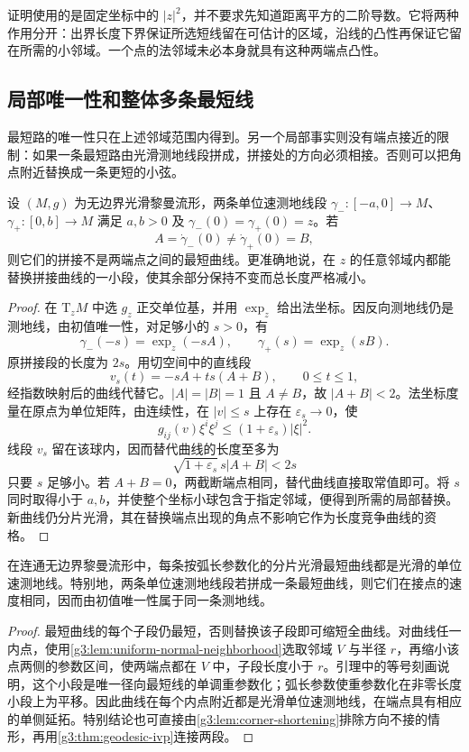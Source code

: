 证明使用的是固定坐标中的 \(|z|^2\)，并不要求先知道距离平方的二阶导数。它将两种作用分开：出界长度下界保证所选短线留在可估计的区域，沿线的凸性再保证它留在所需的小邻域。一个点的法邻域未必本身就具有这种两端点凸性。

\subsection{局部唯一性和整体多条最短线}
\label{g3:subsec:0202:03}

最短路的唯一性只在上述邻域范围内得到。另一个局部事实则没有端点接近的限制：如果一条最短路由光滑测地线段拼成，拼接处的方向必须相接。否则可以把角点附近替换成一条更短的小弦。

\begin{lemma}
	\label{g3:lem:corner-shortening}
	设 \((M,g)\) 为无边界光滑黎曼流形，两条单位速测地线段 \(\gamma_-:[-a,0]\to M\)、\(\gamma_+:[0,b]\to M\) 满足 \(a,b>0\) 及 \(\gamma_-(0)=\gamma_+(0)=z\)。若
	\[
		A=\dot\gamma_-(0)\ne\dot\gamma_+(0)=B,
	\]
	则它们的拼接不是两端点之间的最短曲线。更准确地说，在 \(z\) 的任意邻域内都能替换拼接曲线的一小段，使其余部分保持不变而总长度严格减小。
\end{lemma}
\begin{proof}
	在 \(\mathrm{T}_zM\) 中选 \(g_z\) 正交单位基，并用 \(\exp_z\) 给出法坐标。因反向测地线仍是测地线，由初值唯一性，对足够小的 \(s>0\)，有
	\[
		\gamma_-(-s)=\exp_z(-sA),\qquad
		\gamma_+(s)=\exp_z(sB).
	\]
	原拼接段的长度为 \(2s\)。用切空间中的直线段
	\[
		v_s(t)=-sA+ts(A+B),\qquad 0\leq t\leq1,
	\]
	经指数映射后的曲线代替它。\(|A|=|B|=1\) 且 \(A\ne B\)，故 \(|A+B|<2\)。法坐标度量在原点为单位矩阵，由连续性，在 \(|v|\leq s\) 上存在 \(\varepsilon_s\to0\)，使
	\[
		g_{ij}(v)\xi^i\xi^j\leq(1+\varepsilon_s)|\xi|^2.
	\]
	线段 \(v_s\) 留在该球内，因而替代曲线的长度至多为
	\[
		\sqrt{1+\varepsilon_s}\,s|A+B|<2s
	\]
	只要 \(s\) 足够小。若 \(A+B=0\)，两截断端点相同，替代曲线直接取常值即可。将 \(s\) 同时取得小于 \(a,b\)，并使整个坐标小球包含于指定邻域，便得到所需的局部替换。新曲线仍分片光滑，其在替换端点出现的角点不影响它作为长度竞争曲线的资格。
\end{proof}

\begin{corollary}
	\label{g3:cor:minimizing-curve-geodesic}
	在连通无边界黎曼流形中，每条按弧长参数化的分片光滑最短曲线都是光滑的单位速测地线。特别地，两条单位速测地线段若拼成一条最短曲线，则它们在接点的速度相同，因而由初值唯一性属于同一条测地线。
\end{corollary}
\begin{proof}
	最短曲线的每个子段仍最短，否则替换该子段即可缩短全曲线。对曲线任一内点，使用\cref{g3:lem:uniform-normal-neighborhood}选取邻域 \(V\) 与半径 \(r\)，再缩小该点两侧的参数区间，使两端点都在 \(V\) 中，子段长度小于 \(r\)。引理中的等号刻画说明，这个小段是唯一径向最短线的单调重参数化；弧长参数使重参数化在非零长度小段上为平移。因此曲线在每个内点附近都是光滑单位速测地线，在端点具有相应的单侧延拓。特别结论也可直接由\cref{g3:lem:corner-shortening}排除方向不接的情形，再用\cref{g3:thm:geodesic-ivp}连接两段。
\end{proof}

